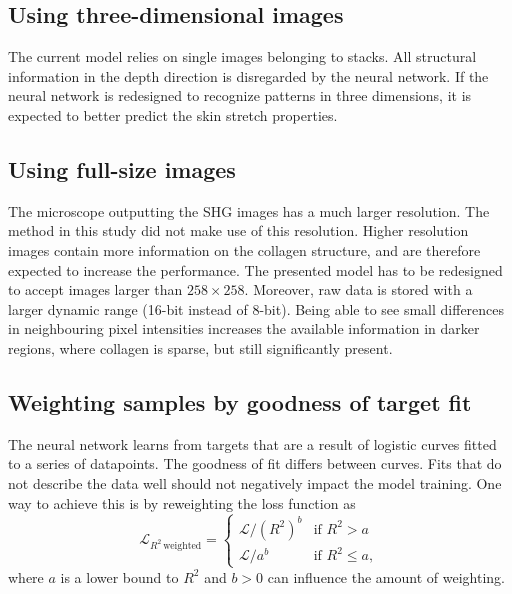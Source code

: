 \subsection{Using three-dimensional images}
The current model relies on single images belonging to stacks.
All structural information in the depth direction is disregarded by the neural network.
If the neural network is redesigned to recognize patterns in three dimensions, it is expected to better predict the skin stretch properties.

\subsection{Using full-size images}
The microscope outputting the SHG images has a much larger resolution.
The method in this study did not make use of this resolution.
Higher resolution images contain more information on the collagen structure, and are therefore expected to increase the performance.
The presented model has to be redesigned to accept images larger than $258\times258$.
Moreover, raw data is stored with a larger dynamic range (16-bit instead of 8-bit).
Being able to see small differences in neighbouring pixel intensities increases the available information \eg in darker regions, where collagen is sparse, but still significantly present.

\subsection{Weighting samples by goodness of target fit}
The neural network learns from targets that are a result of logistic curves fitted to a series of datapoints.
The goodness of fit differs between curves.
Fits that do not describe the data well should not negatively impact the model training.
One way to achieve this is by reweighting the loss function as
\begin{equation}
    \mathcal{L}_{R^2\,\mathrm{weighted}} =
    \begin{cases}
        \mathcal{L} / \left(R^2\right)^b & \text{if } R^2 > a     \\
        \mathcal{L} / a^b                & \text{if } R^2 \leq a,
    \end{cases}
\end{equation}
where $a$ is a lower bound to $R^2$ and $b > 0$ can influence the amount of weighting.
